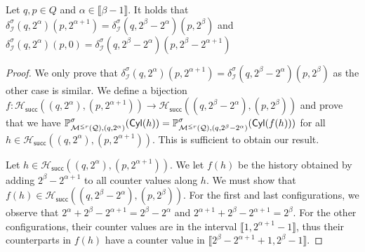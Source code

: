 \documentclass[a4paper,UKenglish,cleveref,autoref,thm-restate,colorlinks]{lipics-v2021}
\newcommand{\integerInterval}[1]{\llbracket{}#1\rrbracket{}}
\newcommand{\cyl}[1]{\mathsf{Cyl}(#1)}
\newcommand{\mdp}{\mathcal{M}}
\newcommand{\mdpTrans}{\delta}
\newcommand{\histPart}{\mathcal{H}}
\newcommand{\hist}{h}
\newcommand{\ocmdp}{\mathcal{Q}}
\newcommand{\ocmdpFin}[2]{\mdp^{\leq #2}(#1)}
\newcommand{\ocStateSpace}{Q}
\newcommand{\ocState}{q}
\newcommand{\ocStateB}{p}
\newcommand{\counterUB}{r}
\newcommand{\intPart}{\mathcal{I}}
\newcommand{\powerIndex}{\alpha}
\newcommand{\powerMax}{\beta}
\newcommand{\compressChainTransTemplate}[2]{\mdpTrans^{#1}_{#2}}
\newcommand{\compressChainTrans}{\compressChainTransTemplate{\strat}{\intPart}}
\newcommand{\succHist}[2]{\histPart_{\mathsf{succ}}(#1, #2)}
\newcommand{\stratGeneric}[1]{{\sigma_{#1}}}
\newcommand{\strat}{\stratGeneric{}}
\begin{document}
\begin{lemma}\label{lemma:abstraction:transitions:symmetry}
  Let $\ocState, \ocStateB\in\ocStateSpace$ and $\powerIndex\in\integerInterval{\powerMax-1}$.
  It holds that $\compressChainTrans(\ocState, 2^\powerIndex)(\ocStateB, 2^{\powerIndex+1}) = \compressChainTrans(\ocState, 2^\powerMax-2^\powerIndex)(\ocStateB, 2^\powerMax)$ and $\compressChainTrans(\ocState, 2^\powerIndex)(\ocStateB, 0) = \compressChainTrans(\ocState, 2^\powerMax-2^\powerIndex)(\ocStateB, 2^ \powerMax - 2^{\powerIndex+1})$
\end{lemma}
\begin{proof}
  We only prove that $\compressChainTrans(\ocState, 2^\powerIndex)(\ocStateB, 2^{\powerIndex+1}) = \compressChainTrans(\ocState, 2^\powerMax-2^\powerIndex)(\ocStateB, 2^\powerMax)$ as the other case is similar.
  We define a bijection $f\colon\succHist{(\ocState, 2^\powerIndex)}{(\ocStateB, 2^{\powerIndex+1})}\to\succHist{(\ocState, 2^\powerMax-2^\powerIndex)}{(\ocStateB, 2^\powerMax)}$ and prove that we have $\probaGverb{\ocmdpFin{\ocmdp}{\counterUB}}{(\ocState, 2^\powerIndex)}{\strat}(\cyl{\hist})=\probaGverb{\ocmdpFin{\ocmdp}{\counterUB}}{(\ocState, 2^\powerMax-2^\powerIndex)}{\strat}(\cyl{f(\hist)})$ for all $\hist\in\succHist{(\ocState, 2^\powerIndex)}{(\ocStateB, 2^{\powerIndex+1})}$.
  This is sufficient to obtain our result.

  Let $\hist\in\succHist{(\ocState, 2^\powerIndex)}{(\ocStateB, 2^{\powerIndex+1})}$.
  We let $f(\hist)$ be the history obtained by adding $2^\powerMax-2^{\powerIndex+1}$ to all counter values along $\hist$.
  We must show that $f(\hist)\in\succHist{(\ocState, 2^\powerMax-2^\powerIndex)}{(\ocStateB, 2^\powerMax)}$.
  For the first and last configurations, we observe that $2^\powerIndex + 2^\powerMax - 2^{\powerIndex+1} = 2^\powerMax - 2^\powerIndex$ and $2^{\powerIndex+1} + 2^\powerMax - 2^{\powerIndex+1} = 2^\powerMax$.
  For the other configurations, their counter values are in the interval $\integerInterval{1, 2^{\powerIndex+1}-1}$, thus their counterparts in $f(\hist)$ have a counter value in $\integerInterval{2^\powerMax-2^{\powerIndex+1} + 1, 2^{\powerMax}-1}$.


\end{proof}
\end{document}
